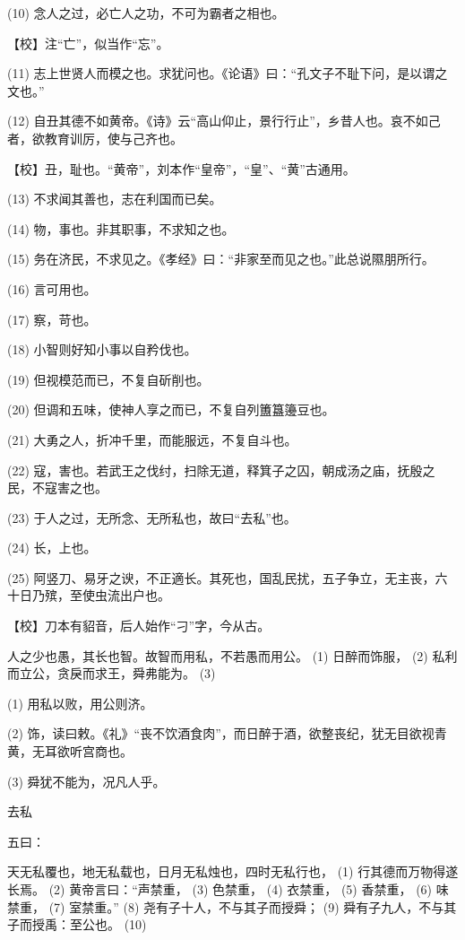 \documentclass[12pt,UTF8]{ctexbook}
\begin{document}
(10) 念人之过，必亡人之功，不可为霸者之相也。

【校】注“亡”，似当作“忘”。

(11) 志上世贤人而模之也。求犹问也。《论语》曰：“孔文子不耻下问，是以谓之文也。”

(12) 自丑其德不如黄帝。《诗》云“高山仰止，景行行止”，乡昔人也。哀不如己者，欲教育训厉，使与己齐也。

【校】丑，耻也。“黄帝”，刘本作“皇帝”，“皇”、“黄”古通用。

(13) 不求闻其善也，志在利国而已矣。

(14) 物，事也。非其职事，不求知之也。

(15) 务在济民，不求见之。《孝经》曰：“非家至而见之也。”此总说隰朋所行。

(16) 言可用也。

(17) 察，苛也。

(18) 小智则好知小事以自矜伐也。

(19) 但视模范而已，不复自斫削也。

(20) 但调和五味，使神人享之而已，不复自列簠簋籩豆也。

(21) 大勇之人，折冲千里，而能服远，不复自斗也。

(22) 寇，害也。若武王之伐纣，扫除无道，释箕子之囚，朝成汤之庙，抚殷之民，不寇害之也。

(23) 于人之过，无所念、无所私也，故曰“去私”也。

(24) 长，上也。

(25) 阿竖刀、易牙之谀，不正適长。其死也，国乱民扰，五子争立，无主丧，六十日乃殡，至使虫流出户也。

【校】刀本有貂音，后人始作“刁”字，今从古。

人之少也愚，其长也智。故智而用私，不若愚而用公。 (1) 日醉而饰服， (2) 私利而立公，贪戾而求王，舜弗能为。 (3)

(1) 用私以败，用公则济。

(2) 饰，读曰敕。《礼》“丧不饮酒食肉”，而日醉于酒，欲整丧纪，犹无目欲视青黄，无耳欲听宫商也。

(3) 舜犹不能为，况凡人乎。





去私


五曰：

天无私覆也，地无私载也，日月无私烛也，四时无私行也， (1) 行其德而万物得遂长焉。 (2) 黄帝言曰：“声禁重， (3) 色禁重， (4) 衣禁重， (5) 香禁重， (6) 味禁重， (7) 室禁重。” (8) 尧有子十人，不与其子而授舜； (9) 舜有子九人，不与其子而授禹：至公也。 (10)
\end{document}
